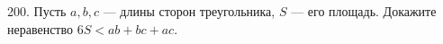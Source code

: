 200. Пусть $a,b,c$ --- длины сторон треугольника, $S$ --- его площадь. Докажите неравенство $6S<ab+bc+ac.$\\
